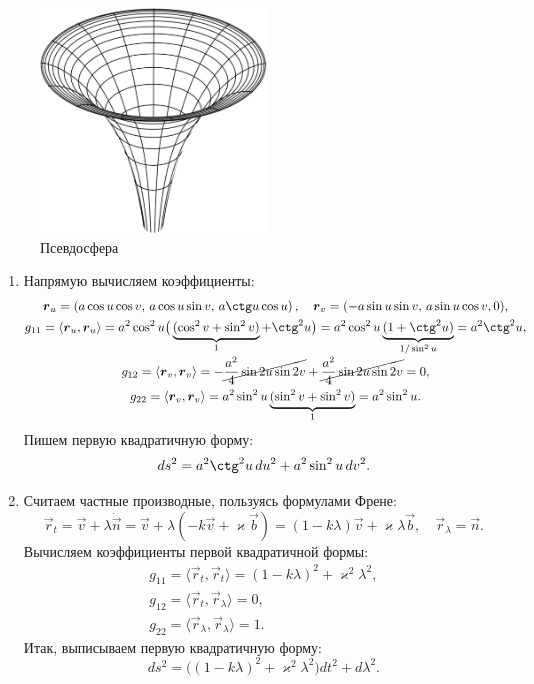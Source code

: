 \begin{figure}[H]
	\centering
	\includegraphics[width=6cm]{./img/Pseudosphere.pdf}
	\caption{Псевдосфера}
\end{figure}

\begin{solution}
	\begin{enumerate}[nolistsep, label=(\arabic*)]
		\item Напрямую вычисляем коэффициенты\footnotemark:
			\begin{gather*}
				\vec{r}_u = \br{a\cos u\cos v,\,a\cos u\sin v,\,a\ctg u\cos u},\quad \vec{r}_v = (-a\sin u\sin v,\,a\sin u\cos v, 0),\\
				g_{11} = \langle\vec{r}_u, \vec{r}_u\rangle = a^2\cos^2u\big(\underbrace{(\cos^2v + \sin^2v)}_1 + \ctg^2u\big) = a^2\cos^2u\underbrace{(1 + \ctg^2u)}_{1 / \sin^2u} = a^2\ctg^2u,\\
				g_{12} = \langle\vec{r}_v, \vec{r}_v\rangle = -\cancel{\frac{a^2}{4}\sin2u\sin2v} + \cancel{\frac{a^2}{4}\sin2u\sin2v} = 0,\\
				g_{22} = \langle\vec{r}_v, \vec{r}_v\rangle = a^2\sin^2u\underbrace{(\sin^2v + \sin^2v)}_1 = a^2\sin^2u.
			\end{gather*}%
			Пишем первую квадратичную форму:
			\[
				ds^2 = a^2\ctg^2u\,du^2 + a^2\sin^2u\,dv^2.
			\]
		\item Считаем частные производные, пользуясь формулами Френе:
			\[
				\vec{r}_t = \vec{v} + \lambda\dot{\vec{n}} = \vec{v} + \lambda(-k\vec{v} + \varkappa\vec{b}) = (1 - k\lambda)\vec{v} + \varkappa\lambda\vec{b},\quad \vec{r}_\lambda = \vec{n}.
			\]
			Вычисляем коэффициенты первой квадратичной формы:
			\begin{gather*}
				g_{11} = \langle\vec{r}_t, \vec{r}_t\rangle = (1 - k\lambda)^2 + \varkappa^2\lambda^2,\\
				g_{12} = \langle\vec{r}_t, \vec{r}_\lambda\rangle = 0,\\
				g_{22} = \langle\vec{r}_\lambda, \vec{r}_\lambda\rangle = 1.
			\end{gather*}
			Итак, выписываем первую квадратичную форму:
			\[
				ds^2 = \big((1 - k\lambda)^2 + \varkappa^2\lambda^2\big)dt^2 + d\lambda^2.
			\]
	\end{enumerate}
\end{solution}

